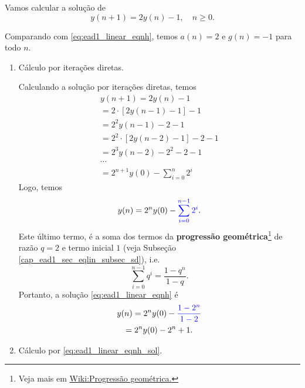 \begin{ex}
  Vamos calcular a solução de
  \begin{equation}\label{eq:ex_ead1_lin_enh}
    y(n+1) = 2y(n) - 1,\quad n\geq 0.
  \end{equation}

  Comparando com \eqref{eq:ead1_linear_eqnh}, temos $a(n) = 2$ e $g(n)=-1$ para todo $n$.

  \begin{enumerate}
  \item Cálculo por iterações diretas.

    Calculando a solução por iterações diretas, temos
    \begin{gather}
      y(n+1) = 2y(n)-1 \\
      = 2\cdot \left[2y(n-1)-1\right]-1 \\
      = 2^2y(n-1)-2-1 \\
      = 2^2\cdot \left[2y(n-2)-1\right]-2-1 \\
      = 2^3y(n-2)-2^2-2-1 \\
      \cdots \nonumber\\
      = 2^{n+1}y(0)-\sum_{i=0}^{n}2^i
    \end{gather}
    Logo, temos
    \begin{equation}
      y(n) = 2^ny(0) - {\color{blue}\sum_{i=0}^{n-1} 2^i}.
    \end{equation}
    Este último termo, é a soma dos termos da {\bf progressão geométrica}\footnote{Veja mais em \href{https://pt.wikipedia.org/wiki/Progress\%C3\%A3o\_geom\%C3\%A9trica}{Wiki:Progressão geométrica.}} de razão $q=2$ e termo inicial $1$ (veja Subseção \ref{cap_ead1_sec_eqlin_subsec_sd}), i.e.
    \begin{equation}
      \sum_{i=0}^{n-1} q^i = \frac{1-q^n}{1-q}.
    \end{equation}
    Portanto, a solução \eqref{eq:ead1_linear_eqnh} é
    \begin{gather}
      y(n) = 2^ny(0) - {\color{blue}\frac{1-2^{n}}{1-2}} \\
      = 2^{n}y(0) -2^{n}+1.
    \end{gather}

  \item Cálculo por \eqref{eq:ead1_linear_eqnh_sol}.
    

\end{enumerate}
\end{ex}
